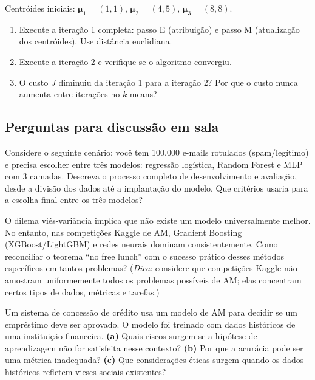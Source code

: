 \documentclass[12pt,a4paper]{article}
\begin{document}
Centróides iniciais: $\boldsymbol{\mu}_1 = (1,1)$, $\boldsymbol{\mu}_2 = (4,5)$, $\boldsymbol{\mu}_3 = (8,8)$.

\begin{enumerate}[label=(\alph*)]
    \item Execute a iteração 1 completa: passo E (atribuição) e passo M (atualização dos centróides). Use distância euclidiana.
    \item Execute a iteração 2 e verifique se o algoritmo convergiu.
    \item O custo $J$ diminuiu da iteração 1 para a iteração 2? Por que o custo nunca aumenta entre iterações no $k$-means?
\end{enumerate}

\subsection{Perguntas para discussão em sala}

\begin{perguntabox}
Considere o seguinte cenário: você tem 100.000 e-mails rotulados (spam/legítimo) e precisa escolher entre três modelos: regressão logística, Random Forest e MLP com 3 camadas. Descreva o processo completo de desenvolvimento e avaliação, desde a divisão dos dados até a implantação do modelo. Que critérios usaria para a escolha final entre os três modelos?
\end{perguntabox}

\begin{perguntabox}
O dilema viés-variância implica que não existe um modelo universalmente melhor. No entanto, nas competições Kaggle de AM, Gradient Boosting (XGBoost/LightGBM) e redes neurais dominam consistentemente. Como reconciliar o teorema ``no free lunch'' com o sucesso prático desses métodos específicos em tantos problemas? (\textit{Dica}: considere que competições Kaggle não amostram uniformemente todos os problemas possíveis de AM; elas concentram certos tipos de dados, métricas e tarefas.)
\end{perguntabox}

\begin{perguntabox}
Um sistema de concessão de crédito usa um modelo de AM para decidir se um empréstimo deve ser aprovado. O modelo foi treinado com dados históricos de uma instituição financeira. \textbf{(a)} Quais riscos surgem se a hipótese de aprendizagem não for satisfeita nesse contexto? \textbf{(b)} Por que a acurácia pode ser uma métrica inadequada? \textbf{(c)} Que considerações éticas surgem quando os dados históricos refletem vieses sociais existentes?
\end{perguntabox}
\end{document}
